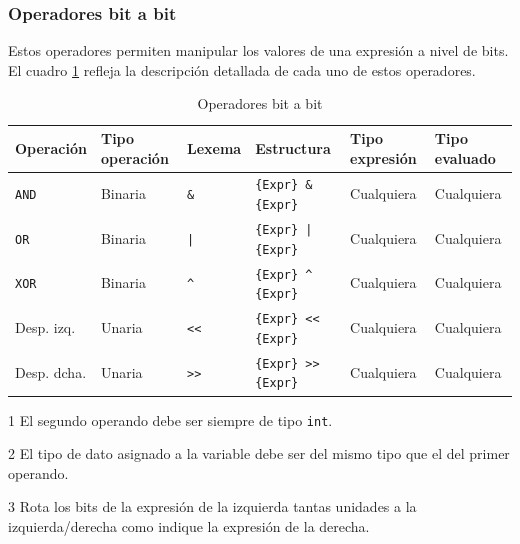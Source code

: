 \documentclass[11pt, english]{article}
\begin{document}
\subsubsection{Operadores bit a bit}\label{bitwise-operators}
Estos operadores permiten manipular los valores de una expresión a nivel de bits. El cuadro \ref{tab:bitwise} refleja la descripción detallada de cada uno de estos operadores.

\begin{table}[H]
	\begin{center}
		\caption{Operadores bit a bit}\label{tab:bitwise}
		\begin{threeparttable}
			\begin{tabular}{l|l|l|l|l|l}
				\toprule
				\textbf{Operación} & \textbf{Tipo operación} & \textbf{Lexema} & \textbf{Estructura} & \textbf{Tipo expresión}\tnote{1} & \textbf{Tipo evaluado}\tnote{2}\\
				\midrule
				\texttt{AND} & Binaria & \texttt{\&} &  \texttt{\{Expr\} \& \{Expr\}} & Cualquiera & Cualquiera\\
				\texttt{OR} & Binaria & \texttt{|} &  \texttt{\{Expr\} | \{Expr\}} & Cualquiera & Cualquiera\\
				\texttt{XOR} & Binaria & \texttt{\textasciicircum} &  \texttt{\{Expr\} \textasciicircum \, \{Expr\}} & Cualquiera & Cualquiera\\
				Desp. izq. & Unaria & \texttt{\textless\textless} &  \texttt{\{Expr\} \textless\textless\, \{Expr\}}\tnote{3}\,& Cualquiera & Cualquiera\\
				Desp. dcha. & Unaria & \texttt{\textgreater\textgreater} & \texttt{\{Expr\} \textgreater\textgreater\, \{Expr\}}\tnote{3}\, & Cualquiera & Cualquiera\\
				\bottomrule
			\end{tabular}
			\begin{tablenotes}
				\small
				\item[1] El segundo operando debe ser siempre de tipo \texttt{int}.
				\item[2] El tipo de dato asignado a la variable debe ser del mismo tipo que el del primer operando.
				\item[3] Rota los bits de la expresión de la izquierda tantas unidades a la izquierda/derecha como indique la expresión de la derecha.
			\end{tablenotes}
		\end{threeparttable}
	\end{center}
\end{table}
\end{document}
